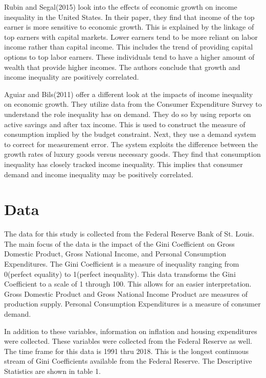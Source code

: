 \documentclass{article}
\begin{document}
\quad Rubin and Segal(2015) look into the effects of economic growth on income inequality in the United States.  In their paper, they find that income of the top earner is more sensitive to economic growth.  This is explained by the linkage of top earners with capital markets.  Lower earners tend to be more reliant on labor income rather than capital income.  This includes the trend of providing capital options to top labor earners.  These individuals tend to have a higher amount of wealth that provide higher incomes. The authors conclude that growth and income inequality are positively correlated. 
\vspace{2mm}

\quad Aguiar and Bils(2011) offer a different look at the impacts of income inequality on economic growth.  They utilize data from the Consumer Expenditure Survey to understand the role inequality has on demand.  They do so by using reports on active savings and after tax income.  This is used to construct the measure of consumption implied by the budget constraint.  Next, they use a demand system to correct for measurement error.  The system exploits the difference between the growth rates of luxury goods versus necessary goods.  They find that consumption inequality has closely tracked income inequality.  This implies that consumer demand and income inequality may be positively correlated.  

\section{Data}
\vspace{2mm}

\quad The data for this study is collected from the Federal Reserve Bank of St. Louis.  The main focus of the data is the impact of the Gini Coefficient on Gross Domestic Product, Gross National Income, and Personal Consumption Expenditures.  The Gini Coefficient is a measure of inequality ranging from 0(perfect equality) to 1(perfect inequality). This data transforms the Gini Coefficient to a scale of 1 through 100.  This allows for an easier interpretation.  Gross Domestic Product and Gross National Income Product are measures of production supply.  Personal Consumption Expenditures is a measure of consumer demand.
\vspace{2mm}

\quad In addition to these variables, information on inflation and housing expenditures were collected.  These variables were collected from the Federal Reserve as well.  The time frame for this data is 1991 thru 2018.  This is the longest continuous stream of Gini Coefficients available from the Federal Reserve.  The Descriptive Statistics are shown in table 1.  
\vspace{2mm}
\end{document}
